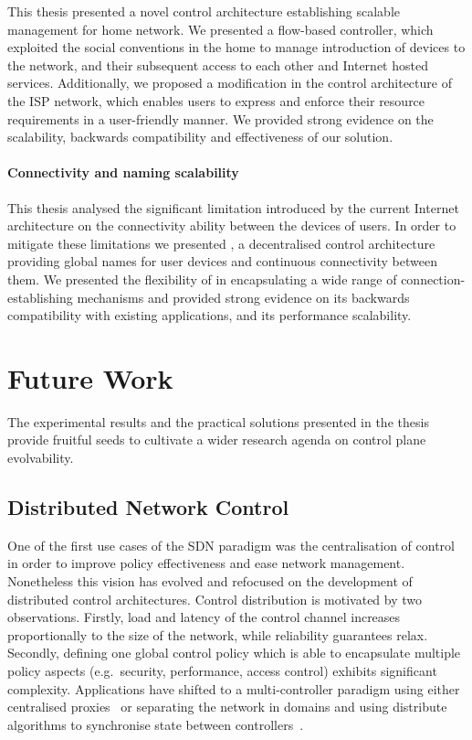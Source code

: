 This thesis presented a novel control architecture establishing scalable
management for home network. We presented a flow-based controller, which exploited
the social conventions in the home to manage introduction of devices  to the
network, and their subsequent access to each other and Internet hosted services.
Additionally, we proposed a modification in the control architecture of the ISP
network, which enables users to express and enforce their resource requirements
in a user-friendly manner. We provided strong evidence on the scalability,
backwards compatibility and effectiveness of our solution.  

\paragraph{Connectivity and naming scalability}

This thesis analysed the significant limitation introduced by the current
Internet architecture on the connectivity ability between the devices of users.
In order to mitigate these limitations we presented \signpost, a decentralised
control architecture providing global names for user devices and continuous
connectivity between them. We presented the flexibility of \signpost in
encapsulating a wide range of connection-establishing mechanisms and provided
strong evidence on its backwards compatibility with existing applications, and its
performance scalability. 

\section{Future Work}

The experimental results and the practical solutions presented in the thesis
provide fruitful seeds to cultivate a wider research agenda on control plane
evolvability.

\subsection{Distributed Network Control}

One of the first use cases of the SDN paradigm was the centralisation of control in
order to improve policy effectiveness and ease network management.  Nonetheless this
vision has evolved and refocused on the development of distributed control
architectures. Control distribution is motivated by two observations.  Firstly,
load and latency of the control channel increases proportionally to the size of the
network, while reliability guarantees relax. Secondly,
defining one global control policy which is able to encapsulate multiple policy
aspects (e.g.~security, performance, access control) exhibits significant
complexity. Applications have shifted to a multi-controller paradigm using
either centralised proxies~\cite{flowvisor-osdi} or separating the network
in domains and using distribute algorithms to synchronise state between
controllers~\cite{Koponen10}. 

